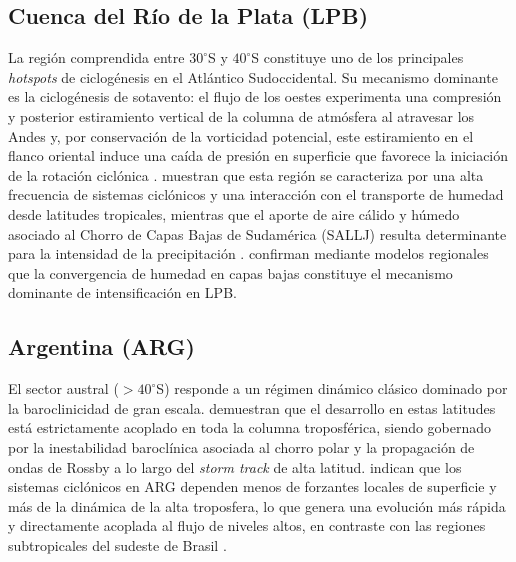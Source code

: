 \subsection{Cuenca del Río de la Plata (LPB)}\label{subsec:tb_lpb}

La región comprendida entre $30^\circ$S y $40^\circ$S constituye uno de los principales \textit{hotspots} de ciclogénesis en el Atlántico Sudoccidental. Su mecanismo dominante es la ciclogénesis de sotavento: el flujo de los oestes experimenta una compresión y posterior estiramiento vertical de la columna de atmósfera al atravesar los Andes y, por conservación de la vorticidad potencial, este estiramiento en el flanco oriental induce una caída de presión en superficie que favorece la iniciación de la rotación ciclónica \citep{gan1994influence}. \citet{reboita2010south} muestran que esta región se caracteriza por una alta frecuencia de sistemas ciclónicos y una interacción con el transporte de humedad desde latitudes tropicales, mientras que el aporte de aire cálido y húmedo asociado al Chorro de Capas Bajas de Sudamérica (SALLJ) resulta determinante para la intensidad de la precipitación \citep{crespo2020potential}. \citet{gramcianinov2024early} confirman mediante modelos regionales que la convergencia de humedad en capas bajas constituye el mecanismo dominante de intensificación en LPB.

\subsection{Argentina (ARG)}\label{subsec:tb_arg}

El sector austral ($>40^\circ$S) responde a un régimen dinámico clásico dominado por la baroclinicidad de gran escala. \citet{hoskins2005new} demuestran que el desarrollo en estas latitudes está estrictamente acoplado en toda la columna troposférica, siendo gobernado por la inestabilidad baroclínica asociada al chorro polar y la propagación de ondas de Rossby a lo largo del \textit{storm track} de alta latitud. \citet{simmonds2000variability} indican que los sistemas ciclónicos en ARG dependen menos de forzantes locales de superficie y más de la dinámica de la alta troposfera, lo que genera una evolución más rápida y directamente acoplada al flujo de niveles altos, en contraste con las regiones subtropicales del sudeste de Brasil \citep{vera2002cold}.


